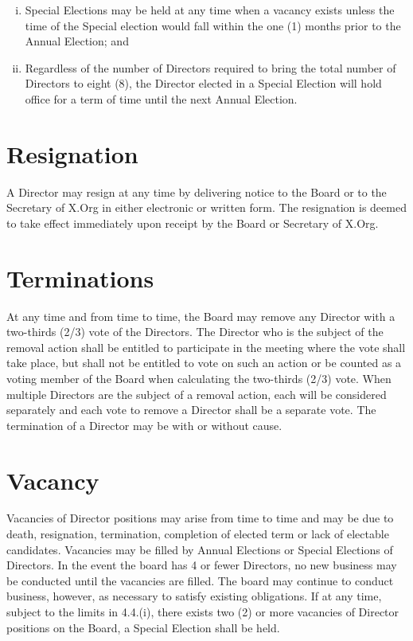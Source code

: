 \documentclass[10pt, english]{bylaws}
\begin{document}
\begin{enumerate}[(i)\hspace{.2cm}]
	\item Special Elections may be held at any time when a vacancy exists
	unless the time of the Special election would fall within the one (1)
	months prior to the Annual Election; and

	\item Regardless of the number of Directors required to bring the total
	number of Directors to eight (8), the Director elected in a Special
	Election will hold office for a term of time until the next Annual
	Election.
\end{enumerate}

\section{Resignation}
A Director may resign at any time by delivering notice to the Board or to the
Secretary of X.Org in either electronic or written form.  The resignation is
deemed to take effect immediately upon receipt by the Board or Secretary of
X.Org.

\section{Terminations}
At any time and from time to time, the Board may remove any Director with a
two-thirds (2/3) vote of the Directors.  The Director who is the subject of the
removal action shall be entitled to participate in the meeting where the vote
shall take place, but shall not be entitled to vote on such an action or be
counted as a voting member of the Board when calculating the two-thirds (2/3)
vote.  When multiple Directors are the subject of a removal action, each will be
considered separately and each vote to remove a Director shall be a separate
vote.  The termination of a Director may be with or without cause.

\section{Vacancy}
Vacancies of Director positions may arise from time to time and may be due to
death, resignation, termination, completion of elected term or lack of electable
candidates.  Vacancies may be filled by Annual Elections or Special Elections of
Directors.  In the event the board has 4 or fewer Directors, no new business may
be conducted until the vacancies are filled. The board may continue to conduct
business, however, as necessary to satisfy existing obligations. If at any time,
subject to the limits in 4.4.(i), there exists two (2) or more vacancies of
Director positions on the Board, a Special Election shall be held.
\end{document}
